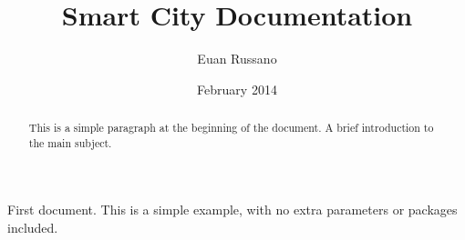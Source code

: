 \documentclass[12pt, letterpaper]{article}
\title{Smart City Documentation}
\author{Euan Russano}
\date{February 2014}
\begin{document}
\begin{titlepage}
\maketitle
\end{titlepage}

\begin{abstract}
This is a simple paragraph at the beginning of the document. A brief introduction to the main subject.
\end{abstract}

First document. This is a simple example, with no 
extra parameters or packages included.
\end{document}
